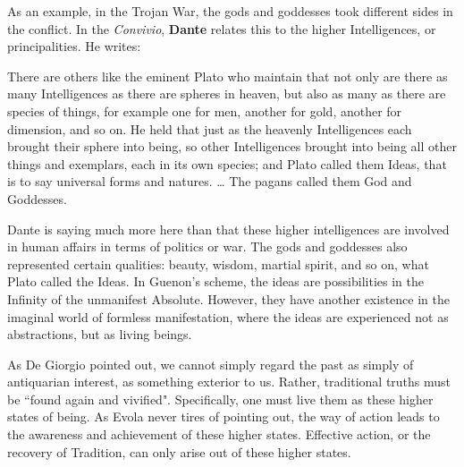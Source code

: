 As an example, in the Trojan War, the gods and goddesses took different sides in the conflict. In the \emph{Convivio}, \textbf{Dante} relates this to the higher Intelligences, or principalities. He writes:

\begin{quotex}
There are others like the eminent Plato who maintain that not only are there as many Intelligences as there are spheres in heaven, but also as many as there are species of things, for example one for men, another for gold, another for dimension, and so on. He held that just as the heavenly Intelligences each brought their sphere into being, so other Intelligences brought into being all other things and exemplars, each in its own species; and Plato called them Ideas, that is to say universal forms and natures. … The pagans called them God and Goddesses. 

\end{quotex}
Dante is saying much more here than that these higher intelligences are involved in human affairs in terms of politics or war. The gods and goddesses also represented certain qualities: beauty, wisdom, martial spirit, and so on, what Plato called the Ideas. In Guenon's scheme, the ideas are possibilities in the Infinity of the unmanifest Absolute. However, they have another existence in the imaginal world of formless manifestation, where the ideas are experienced not as abstractions, but as living beings.

As De Giorgio pointed out, we cannot simply regard the past as simply of antiquarian interest, as something exterior to us. Rather, traditional truths must be ``found again and vivified". Specifically, one must live them as these higher states of being. As Evola never tires of pointing out, the way of action leads to the awareness and achievement of these higher states. Effective action, or the recovery of Tradition, can only arise out of these higher states.

